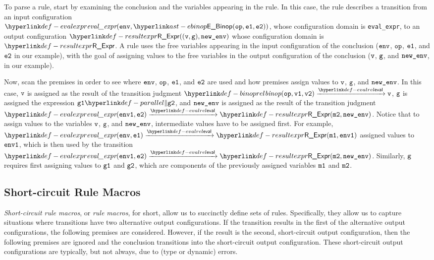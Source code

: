 To parse a rule, start by examining the conclusion and the variables appearing in the rule.
In this case, the rule describes a transition from an input configuration \\
$\evalexpr{ \env, \EBinop(\op, \veone, \vetwo) }$,
whose configuration domain is \texttt{eval\_expr}, to an output configuration $\ResultExpr((\vv, \vg), \newenv)$
whose configuration domain is $\ResultExpr$.
%
A rule uses the free variables appearing in the input configuration of the conclusion
($\texttt{env}$, $\texttt{op}$, $\texttt{e1}$, and $\texttt{e2}$ in our example),
with the goal of assigning values to the free variables in the output configuration
of the conclusion ($\texttt{v}$, $\texttt{g}$, and $\texttt{new\_env}$, in our example).

Now, scan the premises in order to see where $\texttt{env}$, $\texttt{op}$, $\texttt{e1}$, and $\texttt{e2}$ are used and how
premises assign values to $\texttt{v}$, $\texttt{g}$, and $\texttt{new\_env}$.
%
In this case, $\texttt{v}$ is assigned as the result of the transition judgment
$\binoprel(\op, \vvone, \vvtwo) \evalarrow \vv$,
$\texttt{g}$ is assigned the expression $\vgone \parallelcomp \vgtwo$,
and $\texttt{new\_env}$ is assigned as the result of the transition judgment
$\evalexpr{ \envone, \vetwo } \evalarrow \ResultExpr(\vmtwo, \newenv)$.
%
Notice that to assign values to the variables $\texttt{v}$, $\texttt{g}$, and $\texttt{new\_env}$,
intermediate values have to be assigned first.
For example, $\evalexpr{ \env, \veone} \evalarrow \ResultExpr(\vmone, \envone)$
assigned values to $\texttt{env1}$, which is then used by the transition \\
$\evalexpr{ \envone, \vetwo } \evalarrow \ResultExpr(\vmtwo, \newenv)$.
Similarly, $\texttt{g}$ requires first assigning values to $\texttt{g1}$ and $\texttt{g2}$,
which are components of the previously assigned variables $\texttt{m1}$ and $\texttt{m2}$.

\subsection{Short-circuit Rule Macros\label{sec:ShortCircuitRuleMacros}}

\emph{Short-circuit rule macros}, or \emph{rule macros}, for short, allow us to succinctly define sets of rules.
Specifically, they allow us to capture situations where
transitions have two alternative output configurations.
If the transition results in the first of the alternative output configurations, the following premises are considered.
However, if the result is the second, short-circuit output configuration, then the following premises are ignored
and the conclusion transitions into the short-circuit output configuration.
These short-circuit output configurations are typically, but not always, due to (type or dynamic) errors.

